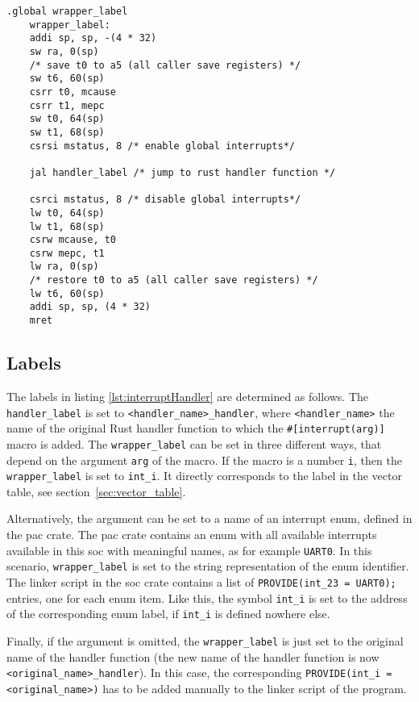 \begin{lstlisting}[language={[RISC-V]Assembler}, caption={Interrupt Handler Wrapper}, label={lst:interruptHandler}]
    .global wrapper_label
    wrapper_label:
    addi sp, sp, -(4 * 32)
    sw ra, 0(sp)
    /* save t0 to a5 (all caller save registers) */
    sw t6, 60(sp)
    csrr t0, mcause
    csrr t1, mepc
    sw t0, 64(sp)
    sw t1, 68(sp)
    csrsi mstatus, 8 /* enable global interrupts*/
    
    jal handler_label /* jump to rust handler function */
    
    csrci mstatus, 8 /* disable global interrupts*/
    lw t0, 64(sp)
    lw t1, 68(sp)
    csrw mcause, t0
    csrw mepc, t1
    lw ra, 0(sp)
    /* restore t0 to a5 (all caller save registers) */
    lw t6, 60(sp)
    addi sp, sp, (4 * 32)
    mret
\end{lstlisting}

\subsection{Labels}
\label{sec:interrupt_macro_labels}
The labels in listing \ref{lst:interruptHandler} are determined as follows. The \texttt{handler_label} is set to \texttt{<handler_name>_handler}, where \texttt{<handler_name>} the name of the original Rust handler function to which the \texttt{\#[interrupt(arg)]} macro is added. The \texttt{wrapper_label} can be set in three different ways, that depend on the argument \texttt{arg} of the macro. If the macro is a number \texttt{i}, then the \texttt{wrapper_label} is set to \texttt{int_i}. It directly corresponds to the label in the vector table, see section~\ref{sec:vector_table}.

Alternatively, the argument can be set to a name of an interrupt enum, defined in the \gls{pac} crate. 
The \gls{pac} crate contains an enum with all available interrupts available in this \gls{soc} with meaningful names, as for example \texttt{UART0}. In this scenario, \texttt{wrapper_label} is set to the string representation of the enum identifier.
The linker script in the \gls{soc} crate contains a list of \texttt{PROVIDE(int_23 = UART0);} entries, one for each enum item. Like this, the symbol \texttt{int_i} is set to the address of the corresponding enum label, if \texttt{int_i} is defined nowhere else.

Finally, if the argument is omitted, the \texttt{wrapper_label} is just set to the original name of the handler function (the new name of the handler function is now \texttt{<original_name>_handler}). In this case, the corresponding \texttt{PROVIDE(int_i = <original_name>)} has to be added manually to the linker script of the program.

